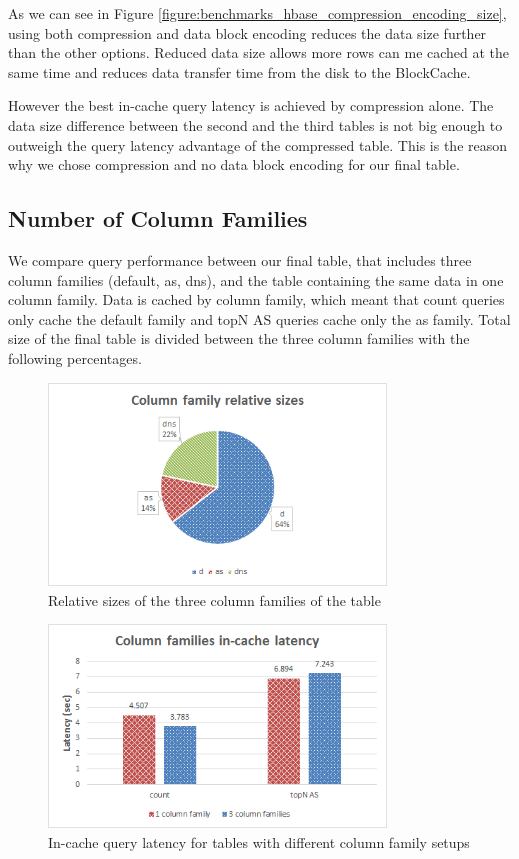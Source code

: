 As we can see in Figure \ref{figure:benchmarks_hbase_compression_encoding_size}, using both compression and data block encoding reduces the data size further than the other options. Reduced data size allows more rows can me cached at the same time and reduces data transfer time from the disk to the BlockCache.

However the best in-cache query latency is achieved by compression alone. The data size difference between the second and the third tables is not big enough to outweigh the query latency advantage of the compressed table. This is the reason why we chose compression and no data block encoding for our final table.

\subsection{Number of Column Families}

We compare query performance between our final table, that includes three column families (default, as, dns), and the table containing the same data in one column family. Data is cached by column family, which meant that count queries only cache the default family and topN AS queries cache only the as family.
Total size of the final table is divided between the three column families with the following percentages.

\begin{figure}[H]
\centering
\includegraphics[width=0.8\textwidth]{figures/benchmarks_hbase_cf_sizes}
\caption{Relative sizes of the three column families of the table}
\label{figure:benchmarks_hbase_cf_sizes}
\end{figure}

\begin{figure}[H]
\centering
\includegraphics[width=0.8\textwidth]{figures/benchmarks_hbase_cf_in-cache_latency}
\caption{In-cache query latency for tables with different column family setups}
\label{figure:benchmarks_hbase_cf_in-cache_latency}
\end{figure}

